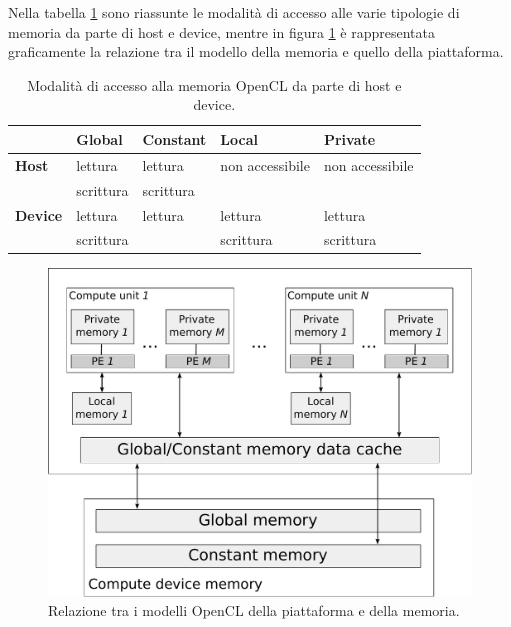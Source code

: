 \documentclass[12pt,a4paper,oneside]{book}
\begin{document}
Nella tabella \ref{tab:opencl-memory-access} sono riassunte le modalità di accesso alle varie tipologie di memoria da parte di host e device, mentre in figura \ref{fig:opencl-memory-model} è rappresentata graficamente la relazione tra il modello della memoria e quello della piattaforma.

\begin{table}[p]
\begin{center}
\begin{tabular}{|l|l|l|l|l|}
\hline
 & \textbf{Global} &  \textbf{Constant} & \textbf{Local} & \textbf{Private} \\
\hline
\textbf{Host} & lettura   & lettura   & non accessibile & non accessibile \\
              & scrittura & scrittura &                 &                 \\
\hline
\textbf{Device} & lettura   & lettura & lettura   & lettura   \\
                & scrittura &         & scrittura & scrittura \\
\hline
\end{tabular}
\caption{Modalità di accesso alla memoria \ac{OpenCL} da parte di host e device.\label{tab:opencl-memory-access}}
\end{center}
\end{table}

\begin{figure}[p]
\begin{center}
\includegraphics[width=\textwidth]{img/opencl-memory-model}
\caption{Relazione tra i modelli \ac{OpenCL} della piattaforma e della memoria.\label{fig:opencl-memory-model}}
\end{center}
\end{figure}
\end{document}

